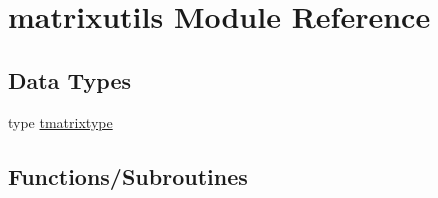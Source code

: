 \hypertarget{namespacematrixutils}{}\section{matrixutils Module Reference}
\label{namespacematrixutils}
\subsection*{Data Types}
\begin{DoxyCompactItemize}
\item 
type \mbox{\hyperlink{structmatrixutils_1_1tmatrixtype}{tmatrixtype}}
\end{DoxyCompactItemize}
\subsection*{Functions/\+Subroutines}
